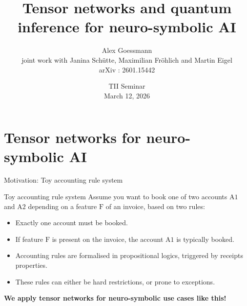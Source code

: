 \documentclass{beamer}
\title[Tensor networks and quantum inference for neuro-symbolic AI]{
    Tensor networks and quantum inference for neuro-symbolic AI
}
\date[March 12, 2026]{TII Seminar\\ March 12, 2026}
\author[A.~Goessmann]{Alex Goessmann \\ joint work with Janina Schütte, Maximilian Fröhlich and Martin Eigel \\
arXiv : 2601.15442}
\institute[WIAS]{
    Weierstraß Institute for Applied Analysis and Stochastics (WIAS)
}
\begin{document}
{\frame[plain]{\titlepage}}


    \addtocounter{framenumber}{-1}


    \section{Tensor networks for neuro-symbolic AI}

    \begin{frame}{Motivation: Toy accounting rule system}

        \begin{block}{Toy accounting rule system}
            Assume you want to book one of two accounts $\mathrm{A1}$ and $\mathrm{A2}$ depending on a feature $\mathrm{F}$ of an invoice, based on two rules:
            \begin{itemize}
                \item \textcolor{\concolor}{Exactly one account must be booked.}
                \item \textcolor{\probcolor}{If feature $\mathrm{F}$ is present on the invoice, the account $\mathrm{A1}$ is typically booked.}
            \end{itemize}
        \end{block}

        \begin{itemize}
            \item {Accounting rules} are formalised in propositional logics, triggered by receipts properties.
            \item These rules can either be \textcolor{\concolor}{hard restrictions}, or \textcolor{\probcolor}{prone to exceptions}.
        \end{itemize}

        \begin{center}
            \bf We apply tensor networks for neuro-symbolic use cases like this!
        \end{center}

    \end{frame}
\end{document}
